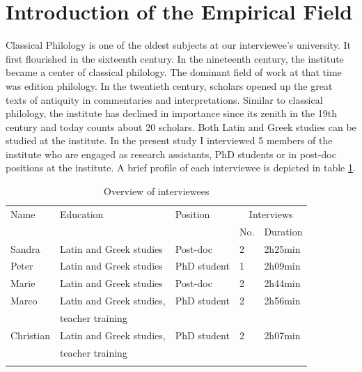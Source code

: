 \documentclass[12pt, a4paper, titlepage, oneside, abstract=true, toc=listof, toc=bibliography]{scrreprt}
\begin{document}
\section{Introduction of the Empirical Field}
\label{sec:introduction_field}
Classical Philology is one of the oldest subjects at our interviewee's university. It first flourished in the sixteenth century. In the nineteenth century, the institute became a center of classical philology. The dominant field of work at that time was edition philology. In the twentieth century, scholars opened up the great texts of antiquity in commentaries and interpretations. Similar to classical philology, the institute has declined in importance since its zenith in the 19th century and today counts about 20 scholars. Both Latin and Greek studies can be studied at the institute.
In the present study I interviewed 5 members of the institute who are engaged as research assistants, PhD students or in post-doc positions at the institute. A brief profile of each interviewee is depicted in table \ref{tab:interviewees}. 

\small
\begin{table}
\caption{Overview of interviewees}
\label{tab:interviewees}
\centering
\begin{tabular}{lllll}
& & & &\\
\hline
Name & Education & Position & \multicolumn{2}{c}{Interviews}\\
 & &  & No. & Duration\\
\hline
\hline
Sandra & Latin and Greek studies & Post-doc & 2 & 2h25min\\
Peter & Latin and Greek studies & PhD student & 1 & 2h09min\\
Marie & Latin and Greek studies & Post-doc & 2 & 2h44min\\
Marco & Latin and Greek studies, & PhD student & 2 & 2h56min\\
      & teacher training & & & \\
Christian & Latin and Greek studies, & PhD student & 2 & 2h07min\\
      & teacher training & & & \\
\hline
& & & &\\
\end{tabular}
\end{table}
\normalsize
\end{document}
